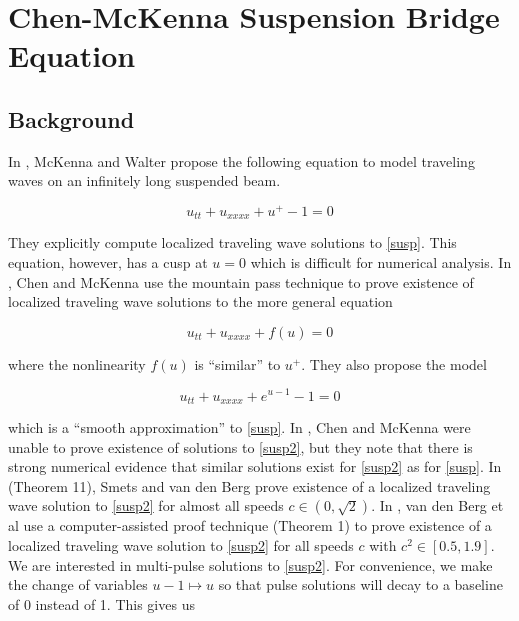 \documentclass[12pt]{article}
\begin{document}
\section{Chen-McKenna Suspension Bridge Equation}

\subsection{Background}

In \cite{McKenna1990}, McKenna and Walter propose the following equation to model traveling waves on an infinitely long suspended beam.

\begin{equation}\label{susp}
u_{tt} + u_{xxxx} + u^+ - 1 = 0
\end{equation}

They explicitly compute localized traveling wave solutions to \eqref{susp}. This equation, however, has a cusp at $u = 0$ which is difficult for numerical analysis. In \cite{Chen1997}, Chen and McKenna use the mountain pass technique to prove existence of localized traveling wave solutions to the more general equation

\begin{equation}\label{suspgen}
u_{tt} + u_{xxxx} + f(u) = 0
\end{equation}

where the nonlinearity $f(u)$ is ``similar'' to $u^+$. They also propose the model

\begin{equation}\label{susp2}
u_{tt} + u_{xxxx} + e^{u - 1} - 1 = 0
\end{equation}

which is a ``smooth approximation'' to \eqref{susp}. In \cite{Chen1997}, Chen and McKenna were unable to prove existence of solutions to \eqref{susp2}, but they note that there is strong numerical evidence that similar solutions exist for \eqref{susp2} as for \eqref{susp}. In \cite{Smets2002} (Theorem 11), Smets and van den Berg prove existence of a localized traveling wave solution to \eqref{susp2} for almost all speeds $c \in (0, \sqrt{2})$. In \cite{Berg2018}, van den Berg et al use a computer-assisted proof technique (Theorem 1) to prove existence of a localized traveling wave solution to \eqref{susp2} for all speeds $c$ with $c^2 \in [0.5, 1.9]$.\\

We are interested in multi-pulse solutions to \eqref{susp2}. For convenience, we make the change of variables $u - 1 \mapsto u$ so that pulse solutions will decay to a baseline of 0 instead of 1. This gives us
\end{document}
